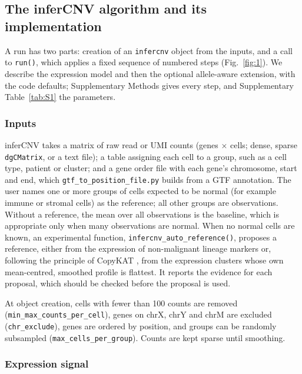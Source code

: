 \subsection{The inferCNV algorithm and its implementation}\label{sec:implementation}

A run has two parts: creation of an \texttt{infercnv} object from the inputs, and a call to \texttt{run()}, which applies a fixed sequence of numbered steps (Fig.~\ref{fig:1}). We describe the expression model and then the optional allele-aware extension, with the code defaults; Supplementary Methods gives every step, and Supplementary Table~\ref{tab:S1} the parameters.


\subsubsection{Inputs}

inferCNV takes a matrix of raw read or UMI counts (genes × cells; dense, sparse \texttt{dgCMatrix}, or a text file); a table assigning each cell to a group, such as a cell type, patient or cluster; and a gene order file with each gene's chromosome, start and end, which \texttt{gtf\_to\_position\_file.py} builds from a GTF annotation. The user names one or more groups of cells expected to be normal (for example immune or stromal cells) as the reference; all other groups are observations. Without a reference, the mean over all observations is the baseline, which is appropriate only when many observations are normal. When no normal cells are known, an experimental function, \texttt{infercnv\_auto\_reference()}, proposes a reference, either from the expression of non-malignant lineage markers or, following the principle of CopyKAT \citep{gao2021copykat}, from the expression clusters whose own mean-centred, smoothed profile is flattest. It reports the evidence for each proposal, which should be checked before the proposal is used.

At object creation, cells with fewer than 100 counts are removed (\texttt{min\_max\_counts\_per\_cell}), genes on chrX, chrY and chrM are excluded (\texttt{chr\_exclude}), genes are ordered by position, and groups can be randomly subsampled (\texttt{max\_cells\_per\_group}). Counts are kept sparse until smoothing.

\subsubsection{Expression signal}

